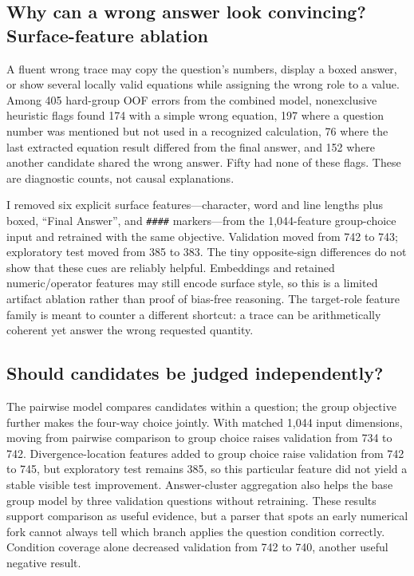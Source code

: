 \documentclass[10pt,a4paper]{article}
\newcommand{\code}[1]{\texttt{#1}}
\begin{document}
\subsection{Why can a wrong answer look convincing? Surface-feature ablation}
A fluent wrong trace may copy the question's numbers, display a boxed answer, or show several locally valid equations while assigning the wrong role to a value. Among 405 hard-group OOF errors from the combined model, nonexclusive heuristic flags found 174 with a simple wrong equation, 197 where a question number was mentioned but not used in a recognized calculation, 76 where the last extracted equation result differed from the final answer, and 152 where another candidate shared the wrong answer. Fifty had none of these flags. These are diagnostic counts, not causal explanations.

I removed six explicit surface features---character, word and line lengths plus boxed, ``Final Answer'', and \code{\#\#\#\#} markers---from the 1,044-feature group-choice input and retrained with the same objective. Validation moved from 742 to 743; exploratory test moved from 385 to 383. The tiny opposite-sign differences do not show that these cues are reliably helpful. Embeddings and retained numeric/operator features may still encode surface style, so this is a limited artifact ablation rather than proof of bias-free reasoning. The target-role feature family is meant to counter a different shortcut: a trace can be arithmetically coherent yet answer the wrong requested quantity.

\subsection{Should candidates be judged independently?}
The pairwise model compares candidates within a question; the group objective further makes the four-way choice jointly. With matched 1,044 input dimensions, moving from pairwise comparison to group choice raises validation from 734 to 742. Divergence-location features added to group choice raise validation from 742 to 745, but exploratory test remains 385, so this particular feature did not yield a stable visible test improvement. Answer-cluster aggregation also helps the base group model by three validation questions without retraining. These results support comparison as useful evidence, but a parser that spots an early numerical fork cannot always tell which branch applies the question condition correctly. Condition coverage alone decreased validation from 742 to 740, another useful negative result.
\end{document}
